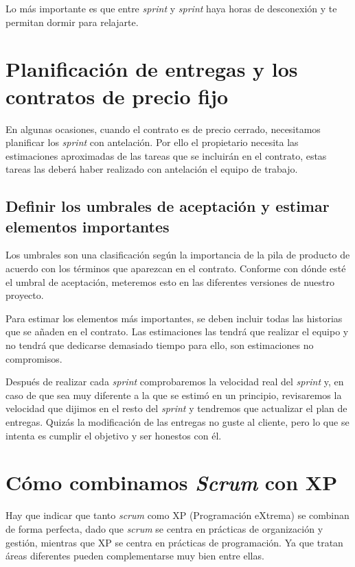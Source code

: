 Lo más importante es que entre \textit{sprint} y \textit{sprint} haya horas de desconexión y te permitan dormir para relajarte.

\section{Planificación de entregas y los contratos de precio fijo}

En algunas ocasiones, cuando el contrato es de precio cerrado, necesitamos planificar los \textit{sprint} con antelación. Por ello el propietario necesita las estimaciones aproximadas de las tareas que se incluirán en el contrato, estas tareas las deberá haber realizado con antelación el equipo de trabajo. 

\subsection{Definir los umbrales de aceptación y estimar elementos importantes}

Los umbrales son una clasificación según la importancia de la pila de producto de acuerdo con los términos que aparezcan en el contrato. Conforme con dónde esté el umbral de aceptación, meteremos esto en las diferentes versiones de nuestro proyecto.

Para estimar los elementos más importantes, se deben incluir todas las historias que se añaden en el contrato. Las estimaciones las tendrá que realizar el equipo y no tendrá que dedicarse demasiado tiempo para ello, son estimaciones no compromisos.


Después de realizar cada \textit{sprint} comprobaremos la velocidad real del \textit{sprint} y, en caso de que sea muy diferente a la que se estimó en un principio, revisaremos la velocidad que dijimos en el resto del \textit{sprint} y tendremos que actualizar el plan de entregas. Quizás la modificación de las entregas no guste al cliente, pero lo que se intenta es cumplir el objetivo y ser honestos con él.

\section{Cómo combinamos \textit{Scrum} con XP}

Hay que indicar que tanto \textit{scrum} como XP (Programación eXtrema) se combinan de forma perfecta, dado que \textit{scrum} se centra en prácticas de organización y gestión, mientras que XP se centra en prácticas de programación. Ya que tratan áreas diferentes pueden complementarse muy bien entre ellas.

